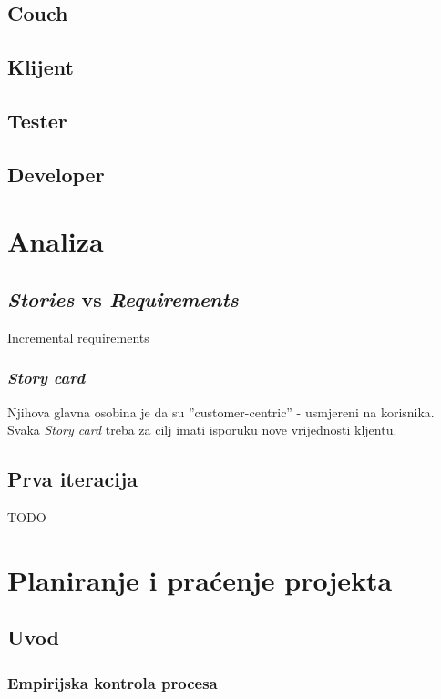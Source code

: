 \documentclass[lmodern, utf8, zavrsni]{fit}
\begin{document}
\section{Couch}

\section{Klijent}

\section{Tester}

\section{Developer}

\chapter{Analiza}

\section{\emph{Stories} vs \emph{Requirements}}

Incremental requirements 

\subsection{\emph{Story card}}

Njihova glavna osobina je da su ''customer-centric'' - usmjereni na korisnika. 
Svaka \emph{Story card} treba za cilj imati isporuku nove vrijednosti kljentu.


\section{Prva iteracija}

TODO

\chapter{Planiranje i praćenje projekta}
\vspace*{-0.7cm}

\section{Uvod}
\subsection{Empirijska kontrola procesa}
\end{document}
